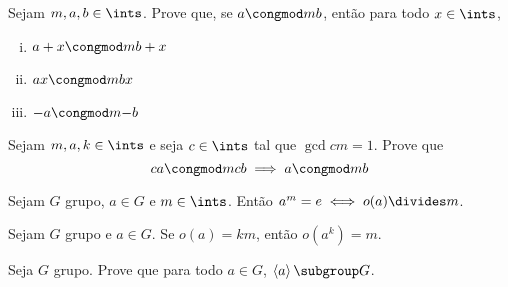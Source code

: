 \begin{exercise}
    Sejam $m, a, b \in \ints$. Prove que, se $a \congmod m b$, então para todo
    $x \in \ints$,
    \begin{enumerate}[(i)]
        \item $a + x \congmod m {b + x}$
        \item $ax \congmod m {bx}$
        \item $-a \congmod m {-b}$
    \end{enumerate}
\end{exercise}

\begin{exercise}
    Sejam $m, a, k \in \ints$ e seja $c \in \ints$ tal que $\gcd c m = 1$.
    Prove que
    $$
    ca \congmod m {cb} \implies a \congmod m b
    $$
\end{exercise}

\begin{exercise}
    Sejam $G$ grupo, $a \in G$ e $m \in \ints$. Então $a^m = e \iff o(a)\divides
    m$.
\end{exercise}

\begin{exercise}
    Sejam $G$ grupo e $a \in G$. Se $o(a) = km$, então $o(a^k) = m$.
\end{exercise}

\begin{exercise}
    Seja $G$ grupo. Prove que para todo $a \in G$, $\left<a\right> \subgroup G$.
\end{exercise}
